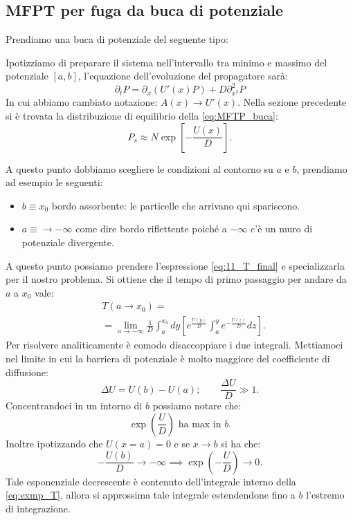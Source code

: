 \subsection{MFPT per fuga da buca di potenziale}%
\label{sub:MFPT per fuga da buca di potenziale}
Prendiamo una buca di potenziale del seguente tipo:

\noindent
Ipotizziamo di preparare il sistema nell'intervallo tra minimo e massimo del potenziale $[ a, b ]$, l'equazione dell'evoluzione del propagatore sarà:
\begin{equation}
    \partial_{t}P = \partial_{x}\left(U'(x) P\right) + D\partial^2_{x^2}P
    \label{eq:MFTP_buca}
\end{equation}
In cui abbiamo cambiato notazione: $A(x) \to U'(x)$. Nella sezione precedente si è trovata la distribuzione di equilibrio della \ref{eq:MFTP_buca}:
\[
    P_s \approx N\exp\left[-\frac{U(x)}{D}\right]
.\] 

\noindent
A questo punto dobbiamo scegliere le condizioni al contorno su $a$ e $b$, prendiamo ad esempio le seguenti:
\begin{itemize}
    \item $b\equiv x_0$ bordo assorbente: le particelle che arrivano qui spariscono.
    \item $a\equiv \to -\infty$ come dire bordo riflettente poiché a $-\infty$ c'è un muro di potenziale divergente.
\end{itemize}
A questo punto possiamo prendere l'espressione \ref{eq:11_T_final} e specializzarla per il nostro problema. Si ottiene che il tempo di primo passaggio per andare da $a$ a $x_0$ vale:
\begin{align}
    &T(a\to x_0) = \nonumber\\
    & = \lim_{a \to -\infty} \frac{1}{D}\int_{a}^{x_0} dy\left[ e^{\frac{U(y)}{D}} \int_{a}^{y} e^{-\frac{U(z)}{D}}dz 
	\label{eq:exmp_T}
\right]
.\end{align}
Per risolvere analiticamente è comodo disaccoppiare i due integrali. 
Mettiamoci nel limite in cui la barriera di potenziale è molto maggiore del coefficiente di diffusione:
\[
    \Delta  U = U(b) -U(a); \qquad \frac{\Delta U}{D}\gg 1
.\] 
Concentrandoci in un intorno di $b$ possiamo notare che:
\[
    \exp\left(\frac{U}{D}\right) \text{ ha max in }b
.\] 
Inoltre ipotizzando che $U(x = a) = 0$ e se $x \to b$ si ha che:
\[
    -\frac{U(b)}{D} \to -\infty \implies  \exp\left(-\frac{U}{D}\right)\to 0
.\] 
Tale esponenziale decrescente è contenuto dell'integrale interno della \ref{eq:exmp_T}, allora si approssima tale integrale estendendone fino a $b$ l'estremo di integrazione. 
